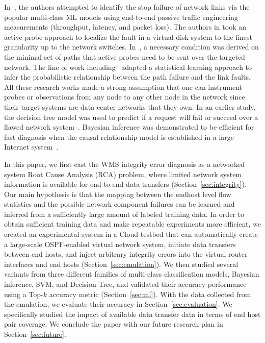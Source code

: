 In~\cite{Link-JIoT-2019}, the authors attempted to identify the stop failure of network links via the popular multi-class ML models using end-to-end passive traffic engineering measurements (throughput, latency, and packet loss). The authors in \cite{DeepView:NSDI18} took an active probe approach to localize the fault in a virtual disk system to the finest granularity up to the network switches. In~\cite{netbouncer:nsdi18}, a necessary condition was derived on the minimal set of paths that active probes need to be sent over the targeted network. The line of work including~\cite{NetPoirot:Sigcomm2016,KDD14} adapted a statistical learning approach to infer the probabilistic relationship between the path failure and the link faults. All these research works made a strong assumption that one can instrument probes or observations from any node to any other node in the network since their target systems are data center networks that they own. In an earlier study, the decision tree model was used to predict if a request will fail or succeed over a flawed network system~\cite{DT:2004}. Bayesian inference was demonstrated to be efficient for fast diagnosis when the causal relationship model is established in a large Internet system~\cite{BN-Internet:2007}.

In this paper, we first cast the WMS integrity error diagnosis as a networked system Root Cause Analysis (RCA) problem, where limited network system information is available for end-to-end data transfers (Section~\ref{sec:integrity}). Our main hypothesis is that the mapping between the endhost level flow statistics and the possible network component failures can be learned and inferred from a sufficiently large amount of labeled training data. In order to obtain sufficient training data and make repeatable experiments more efficient, we created an experimental system in a Cloud testbed that can automatically create a large-scale OSPF-enabled virtual network system, initiate data transfers between end hosts, and inject arbitrary integrity errors into the virtual router interfaces and end hosts (Section~\ref{sec:emulation}). We then studied several variants from three different families of multi-class classification models, Bayesian inference, SVM, and Decision Tree, and validated their accuracy performance using a Top-$k$ accuracy metric (Section~\ref{sec:ml}). With the data collected from the emulation, we evaluate their accuracy in Section~\ref{sec:evaluation}. We specifically studied the impact of available data transfer data in terms of end host pair coverage. We conclude the paper with our future research plan in Section~\ref{sec:future}.
